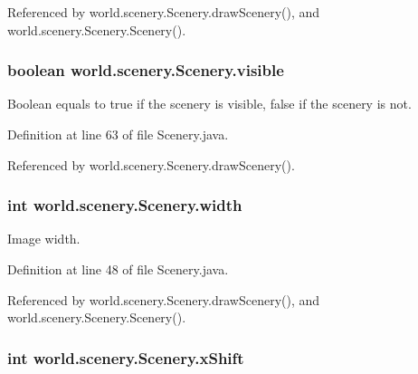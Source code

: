 Referenced by world.\-scenery.\-Scenery.\-draw\-Scenery(), and world.\-scenery.\-Scenery.\-Scenery().

\hypertarget{a00024_a7b22a78d3126c947b7010fdbbea02218}{
\subsubsection[{visible}]{\setlength{\rightskip}{0pt plus 5cm}boolean world.\-scenery.\-Scenery.\-visible\hspace{0.3cm}{\ttfamily [protected]}}}\label{a00024_a7b22a78d3126c947b7010fdbbea02218}


Boolean equals to true if the scenery is visible, false if the scenery is not. 



Definition at line 63 of file Scenery.\-java.



Referenced by world.\-scenery.\-Scenery.\-draw\-Scenery().

\hypertarget{a00024_ad10b27080954e2fc06aa1718f47c4ce1}{
\subsubsection[{width}]{\setlength{\rightskip}{0pt plus 5cm}int world.\-scenery.\-Scenery.\-width\hspace{0.3cm}{\ttfamily [protected]}}}\label{a00024_ad10b27080954e2fc06aa1718f47c4ce1}


Image width. 



Definition at line 48 of file Scenery.\-java.



Referenced by world.\-scenery.\-Scenery.\-draw\-Scenery(), and world.\-scenery.\-Scenery.\-Scenery().

\hypertarget{a00024_a0999f105f7630fd67fd9d440da6983aa}{
\subsubsection[{x\-Shift}]{\setlength{\rightskip}{0pt plus 5cm}int world.\-scenery.\-Scenery.\-x\-Shift\hspace{0.3cm}{\ttfamily [protected]}}}\label{a00024_a0999f105f7630fd67fd9d440da6983aa}


